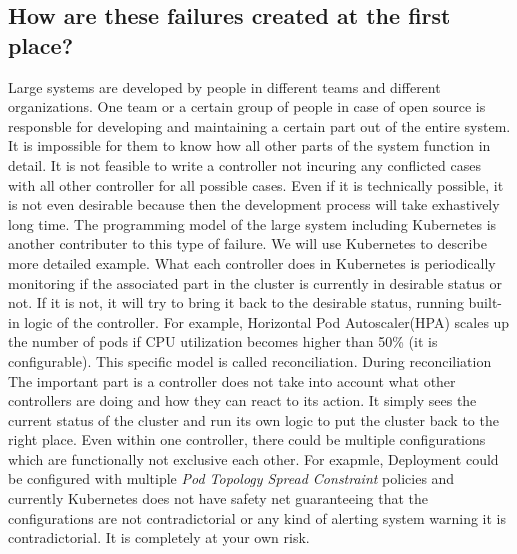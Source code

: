 \subsection*{How are these failures created at the first place?}
Large systems are developed by people in different teams and different organizations. One team or a certain group of people in case of open source is responsble for developing and maintaining a certain part out of the entire system. It is impossible for them to know how all other parts of the system function in detail. It is not feasible to write a controller not incuring any conflicted cases with all other controller for all possible cases. Even if it is technically possible, it is not even desirable because then the development process will take exhastively long time.
The programming model of the large system including Kubernetes is another contributer to this type of failure. We will use Kubernetes to describe more detailed example. What each controller does in Kubernetes is periodically monitoring if the associated part in the cluster is currently in desirable status or not. If it is not, it will try to bring it back to the desirable status, running built-in logic of the controller. For example, Horizontal Pod Autoscaler(HPA) scales up the number of pods if CPU utilization becomes higher than 50\% (it is configurable). This specific model is called reconciliation. During reconciliation The important part is a controller does not take into account what other controllers are doing and how they can react to its action. It simply sees the current status of the cluster and run its own logic to put the cluster back to the right place.
Even within one controller, there could be multiple configurations which are functionally not exclusive each other. For exapmle, Deployment could be configured with multiple \textit{Pod Topology Spread Constraint} policies and currently Kubernetes does not have safety net guaranteeing that the configurations are not contradictorial or any kind of alerting system warning it is contradictorial. It is completely at your own risk.


